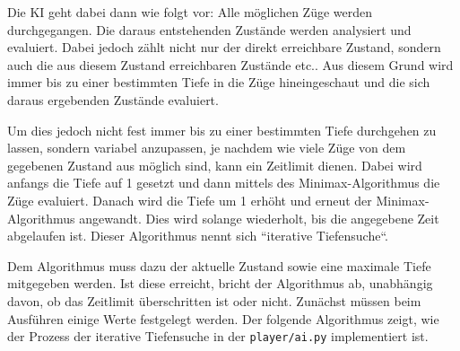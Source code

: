 Die KI geht dabei dann wie folgt vor: Alle möglichen Züge werden
durchgegangen. Die daraus entstehenden Zustände werden analysiert und
evaluiert. Dabei jedoch zählt nicht nur der direkt erreichbare Zustand,
sondern auch die aus diesem Zustand erreichbaren Zustände etc..
Aus diesem Grund wird immer bis zu einer bestimmten Tiefe in die Züge
hineingeschaut und die sich daraus ergebenden Zustände evaluiert.

Um dies jedoch nicht fest immer bis zu einer bestimmten Tiefe durchgehen
zu lassen, sondern variabel anzupassen, je nachdem wie viele Züge von
dem gegebenen Zustand aus möglich sind, kann ein Zeitlimit dienen. Dabei
wird anfangs die Tiefe auf 1 gesetzt und dann mittels des
Minimax-Algorithmus die Züge evaluiert. Danach wird die Tiefe um 1
erhöht und erneut der Minimax-Algorithmus angewandt. Dies wird solange
wiederholt, bis die angegebene Zeit abgelaufen ist. Dieser Algorithmus
nennt sich ``iterative Tiefensuche``.

Dem Algorithmus muss dazu der aktuelle Zustand sowie eine maximale Tiefe
mitgegeben werden. Ist diese erreicht, bricht der Algorithmus ab,
unabhängig davon, ob das Zeitlimit überschritten ist oder nicht.
Zunächst müssen beim Ausführen einige Werte festgelegt werden. Der
folgende Algorithmus zeigt, wie der Prozess der iterative Tiefensuche in
der \texttt{player/ai.py} implementiert ist.

